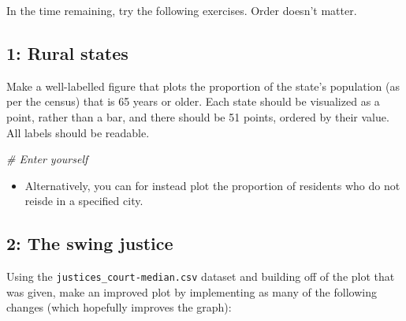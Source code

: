 \documentclass[]{book}
\newenvironment{Shaded}{\begin{snugshade}}{\end{snugshade}}
\newcommand{\CommentTok}[1]{\textcolor[rgb]{0.56,0.35,0.01}{\textit{#1}}}
\providecommand{\tightlist}{%
  \setlength{\itemsep}{0pt}\setlength{\parskip}{0pt}}
\theoremstyle{definition}
\theoremstyle{definition}
\theoremstyle{definition}
\theoremstyle{remark}
\begin{document}
In the time remaining, try the following exercises. Order doesn't
matter.

\subsection*{1: Rural states}\label{rural-states}

Make a well-labelled figure that plots the proportion of the state's
population (as per the census) that is 65 years or older. Each state
should be visualized as a point, rather than a bar, and there should be
51 points, ordered by their value. All labels should be readable.

\begin{Shaded}
\begin{Highlighting}[]
\CommentTok{# Enter yourself}
\end{Highlighting}
\end{Shaded}

\begin{itemize}
\tightlist
\item
  Alternatively, you can for instead plot the proportion of residents
  who do not reisde in a specified city.
\end{itemize}

\subsection*{2: The swing justice}\label{the-swing-justice}

Using the \texttt{justices\_court-median.csv} dataset and building off
of the plot that was given, make an improved plot by implementing as
many of the following changes (which hopefully improves the graph):
\end{document}
